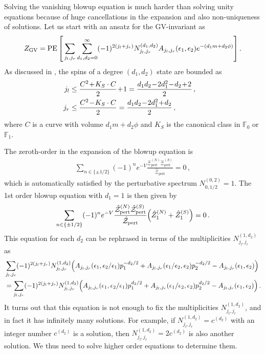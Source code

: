 Solving the vanishing blowup equation is much harder than solving unity equations because of huge cancellations in the expansion and also non-uniqueness of solutions. Let us start with an ansatz for the GV-invariant as
\begin{align}
Z_{\mathrm{GV}} = \operatorname{PE}\qty[ \,\sum_{j_l, j_r} \sum_{d_1, d_2 = 0}^\infty (-1)^{2(j_l + j_r)} N_{j_l, j_r}^{(d_1, d_2)} A_{j_l, j_r}(\epsilon_1, \epsilon_2) e^{-(d_1 m + d_2 \phi)} ] \, .
\end{align}
As discussed in \cite{Gu:2017ccq}, the spins of a degree $(d_1,d_2)$ state are bounded as
\begin{align}
j_l &\leq \frac{C^2\! +\! K_S \cdot C}{2} \!+\! 1 = \frac{d_1 d_2 \!-\! 2d_1^2 \!-\! d_2\!+\!2}{2} \, , \cr
 j_r &\leq \frac{C^2 \!-\! K_S \cdot C}{2} = \frac{d_1 d_2 \!-\! 2d_1^2 \!+\! d_2}{2}\, ,
\end{align}
where $ C $ is a curve with volume $ d_1 m + d_2 \phi $ and $ K_S $ is the canonical class in $ \mathbb{F}_0 $ or $ \mathbb{F}_1 $.

The zeroth-order in the expansion of the blowup equation is
\begin{align}
\sum_{n \in \{ \pm 1/2 \}} (-1)^n e^{-V} \frac{\hat{\mathcal{Z}}_{\mathrm{pert}}^{(N)} \hat{\mathcal{Z}}_{\mathrm{pert}}^{(S)}}{\hat{\mathcal{Z}}_{\mathrm{pert}}} = 0 \, ,
\end{align}
which is automatically satisfied by the perturbative spectrum $ N_{0, 1/2}^{(0, 2)} = 1 $. The 1st order blowup equation with $d_1=1$ is then given by
\begin{align}
\sum_{n \in \{ \pm 1/2 \}} (-1)^n e^{-V} \frac{\hat{\mathcal{Z}}_{\mathrm{pert}}^{(N)} \hat{\mathcal{Z}}_{\mathrm{pert}}^{(S)}}{\hat{\mathcal{Z}}_{\mathrm{pert}}} \qty(\hat{Z}_1^{(N)} + \hat{Z}_1^{(S)}) = 0 \, .
\end{align}
This equation for each $ d_2 $ can be rephrased in terms of the multiplicities $ N_{j_l,j_r}^{(1, d_2)} $ as
\begin{align}\label{eq:su2_vanishing_1st}
& \sum_{j_l, j_r} (-1)^{2(j_l + j_r)} N_{j_l, j_r}^{(1, d_2)} \qty( A_{j_l, j_r}(\epsilon_1, \epsilon_2/\epsilon_1) p_1^{-d_2/2} + A_{j_l, j_r}(\epsilon_1/\epsilon_2, \epsilon_2) p_2^{-d_2/2} -  A_{j_l, j_r}(\epsilon_1, \epsilon_2)) \nonumber \\
& = \sum_{j_l, j_r} (-1)^{2(j_l + j_r)} N_{j_l, j_r}^{(1, d_2)} \qty( A_{j_l, j_r}(\epsilon_1, \epsilon_2/\epsilon_1) p_1^{d_2/2} + A_{j_l, j_r}(\epsilon_1/\epsilon_2, \epsilon_2) p_2^{d_2/2} -  A_{j_l, j_r}(\epsilon_1, \epsilon_2)) \, .
\end{align}
It turns out that this equation is not enough to fix the multiplicities $ N_{j_l, j_r}^{(1, d_2)} $, and in fact it has infinitely many solutions. For example, if $ N_{j_l,j_r}^{(1, d_2)}=c^{(d_2)} $ with an integer number $c^{(d_2)}$ is a solution, then $ N_{j_l,j_r}^{(1, d_2)} =2c^{(d_2)}$ is also another solution. 
We thus need to solve higher order equations to determine them.

